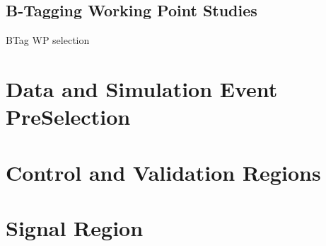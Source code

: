 \subsection{B-Tagging Working Point Studies}
\label{sec:btagNN}

BTag WP selection
\section{Data and Simulation Event PreSelection}
\section{Control and Validation Regions}
\section{Signal Region}



